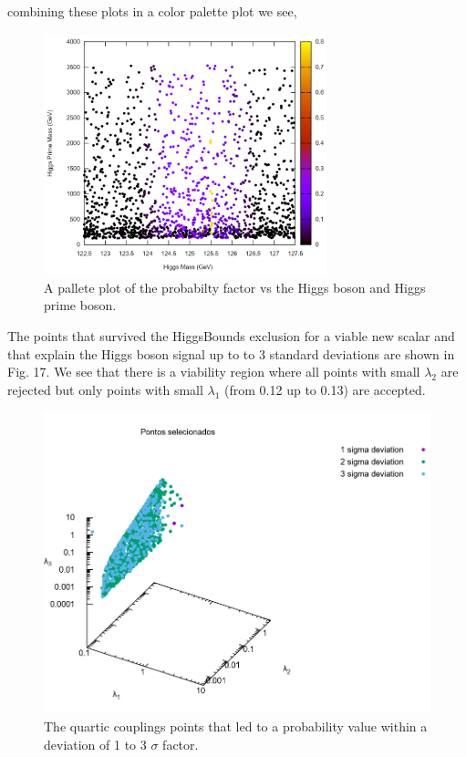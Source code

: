 \documentclass[12pt]{article}
\begin{document}
 combining these plots in a color palette plot we see, 
\begin{figure}[H]
\centering 
  \includegraphics[width=\linewidth,height=7cm,keepaspectratio]{h1vsh2vsobs.png}
  \caption{A pallete plot of the probabilty factor vs the Higgs boson and Higgs prime boson.}\label{fig:awesome_image1}
\end{figure}


The points that survived the HiggsBounds exclusion for a viable new scalar and that explain the Higgs boson signal up to to 3 standard deviations are shown in Fig. 17. We see that there is a viability region where all points with small $\lambda_2$ are rejected but only points with small $\lambda_1$ (from 0.12 up to 0.13) are accepted.

\begin{figure}[H]
\centering 
  \includegraphics[width=1\linewidth]{signals.png}
  \caption{The quartic couplings points that led to a probability value within a deviation of 1 to 3 $\sigma$ factor.}\label{fig:awesome_image3}
\end{figure}
\end{document}
